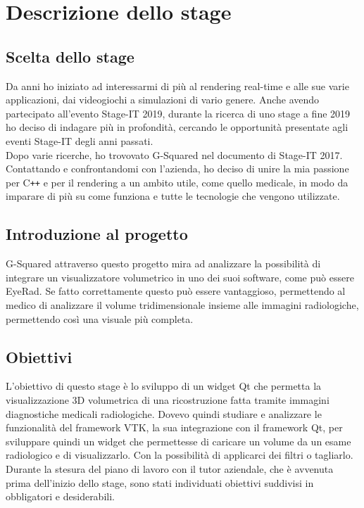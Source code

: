 
\chapter{Descrizione dello stage}
\label{cap:descrizione-stage}

\section{Scelta dello stage}
\label{scelta-dello-stage}
Da anni ho iniziato ad interessarmi di più al rendering real-time e alle sue varie applicazioni, dai videogiochi a simulazioni di vario genere.
Anche avendo partecipato all'evento Stage-IT 2019, durante la ricerca di uno stage a fine 2019 ho deciso di indagare più in profondità, cercando le opportunità presentate agli eventi Stage-IT degli anni passati. \\
Dopo varie ricerche, ho trovovato G-Squared nel documento di Stage-IT 2017. Contattando e confrontandomi con l'azienda, ho deciso di unire la mia passione per C\texttt{++} e per il rendering a un ambito utile, come quello medicale, in modo da imparare di più su come funziona e tutte le tecnologie che vengono utilizzate.

\section{Introduzione al progetto}
G-Squared attraverso questo progetto mira ad analizzare la possibilità di integrare un visualizzatore volumetrico in uno dei suoi software, come può essere EyeRad. Se fatto correttamente questo può essere vantaggioso, permettendo al medico di analizzare il volume tridimensionale insieme alle immagini radiologiche, permettendo così una visuale più completa.

\section{Obiettivi}
L'obiettivo di questo stage è lo sviluppo di un widget Qt che permetta la visualizzazione 3D volumetrica di una ricostruzione fatta tramite immagini diagnostiche medicali radiologiche. Dovevo quindi studiare e analizzare le funzionalità del framework VTK, la sua integrazione con il framework Qt, per sviluppare quindi un widget che permettesse di caricare un volume da un esame radiologico e di visualizzarlo. Con la possibilità di applicarci dei filtri o tagliarlo.
Durante la stesura del piano di lavoro con il tutor aziendale, che è avvenuta prima dell’inizio dello stage, sono stati individuati obiettivi suddivisi in obbligatori e desiderabili.

